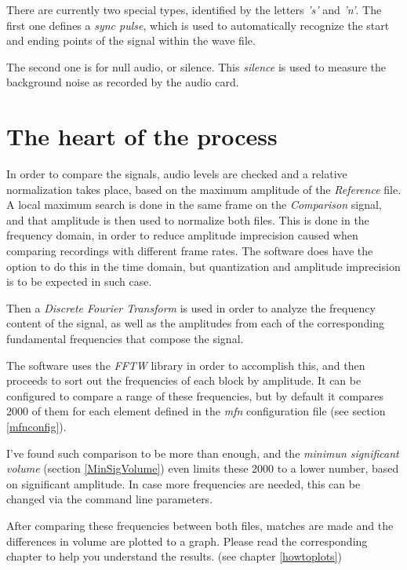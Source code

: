 \documentclass[10pt,a4paper]{report}
\begin{document}
There are currently two special types, identified by the letters \textit{'s'} and \textit{'n'}. The first one defines a \textit{sync pulse}, which is used to automatically recognize the start and ending points of the signal within the wave file. 

The second one is for null audio, or silence. This \textit{silence} is used to measure the background noise as recorded by the audio card. 

\section{The heart of the process}

In order to compare the signals, audio levels are checked and a relative normalization takes place, based on the maximum amplitude of the \textit{Reference} file. A local maximum search is done in the same frame on the \textit{Comparison} signal, and that amplitude is then used to normalize both files. This is done in the frequency domain, in order to reduce amplitude imprecision caused when comparing recordings with different frame rates. The software does have the option to do this in the time domain, but quantization and amplitude imprecision is to be expected in such case.

Then a \textit{Discrete Fourier Transform}\cite{FourierTransformApps} is used in order to analyze the frequency content of the signal, as well as the amplitudes from each of the corresponding fundamental frequencies that compose the signal.

The software uses the \textit{FFTW}\cite{fftw} library in order to accomplish this, and then proceeds to sort out the frequencies of each block by amplitude. It can be configured to compare a range of these frequencies, but by default it compares 2000 of them for each element defined in the \textit{mfn} configuration file (see section \ref{mfnconfig}).

I've found such comparison to be more than enough, and the \textit{minimun significant volume} (section \ref{MinSigVolume}) even limits these 2000 to a lower number, based on significant amplitude. In case more frequencies are needed, this can be changed via the command line parameters.

After comparing these frequencies between both files, matches are made and the differences in volume are plotted to a graph. Please read the corresponding chapter to help you understand the results. (see chapter \ref{howtoplots})
\end{document}
